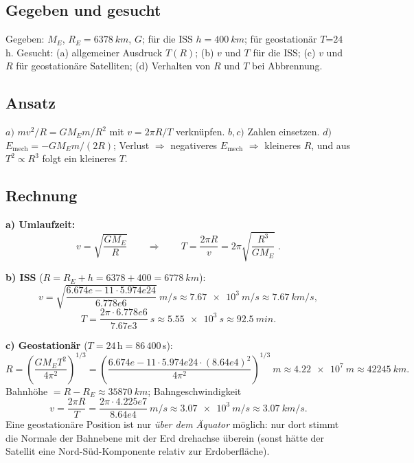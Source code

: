 
\subsection*{Gegeben und gesucht}
Gegeben: $M_E$, $R_E=\qty{6378}{km}$, $G$; für die ISS $h=\qty{400}{km}$;
für geostationär $T$=$24$\,h.
Gesucht: (a) allgemeiner Ausdruck $T(R)$; (b) $v$ und $T$ für die ISS;
(c) $v$ und $R$ für geostationäre Satelliten; (d) Verhalten von $R$ und $T$
bei Abbrennung.

\subsection*{Ansatz}
$a)$ $m v^2/R = GM_Em/R^2$ mit $v=2\pi R/T$ verknüpfen.
$b,c)$ Zahlen einsetzen. $d)$ $E_\mathrm{mech}=-GM_Em/(2R)$; Verlust
$\Rightarrow$ negativeres $E_\mathrm{mech}$ $\Rightarrow$ kleineres $R$,
und aus $T^2\propto R^3$ folgt ein kleineres $T$.

\subsection*{Rechnung}
\textbf{a) Umlaufzeit:}
\begin{equation}
  v = \sqrt{\frac{GM_E}{R}}\qquad\Rightarrow\qquad
  T = \frac{2\pi R}{v} = 2\pi\sqrt{\frac{R^3}{G M_E}}\;.
\end{equation}

\textbf{b) ISS} ($R=R_E+h=6378+400=\qty{6778}{km}$):
\begin{equation}
  v
  = \sqrt{\frac{6.674e-11\cdot 5.974e24}{6.778e6}}\ \si{m/s}
  \approx \qty{7.67e3}{m/s}\approx \qty{7.67}{km/s},
\end{equation}
\begin{equation}
  T
  = \frac{2\pi\cdot 6.778e6}{7.67e3}\ \si{s}
  \approx \qty{5.55e3}{s}
  \approx \qty{92.5}{min}.
\end{equation}

\textbf{c) Geostationär} ($T=24\,\mathrm h=86\,400$\,s):
\begin{equation}
  R
  = \left(\frac{G M_E T^2}{4\pi^2}\right)^{1/3}
  = \left(\frac{6.674e-11\cdot 5.974e24\cdot(8.64e4)^2}{4\pi^2}\right)^{1/3}\ \si{m}
  \approx \qty{4.22e7}{m}
  \approx \qty{42245}{km}.
\end{equation}
Bahnhöhe $=R-R_E\approx\qty{35870}{km}$; Bahngeschwindigkeit
\begin{equation}
  v = \frac{2\pi R}{T}
  = \frac{2\pi\cdot 4.225e7}{8.64e4}\ \si{m/s}
  \approx \qty{3.07e3}{m/s}\approx\qty{3.07}{km/s}.
\end{equation}
Eine geostationäre Position ist nur \emph{über dem Äquator} möglich: nur dort
stimmt die Normale der Bahnebene mit der Erd drehachse überein (sonst hätte
der Satellit eine Nord-Süd-Komponente relativ zur Erdoberfläche).

